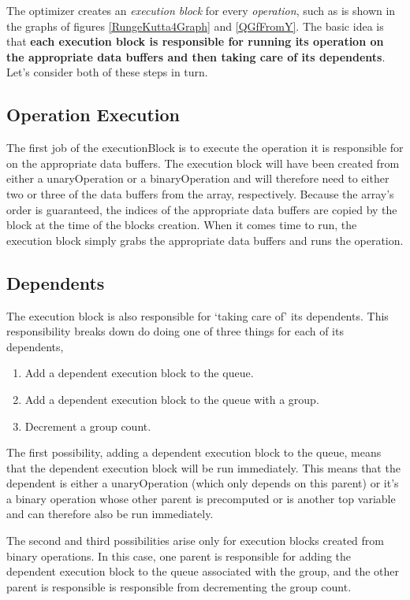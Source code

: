 \documentclass[11pt]{article}
\begin{document}
The optimizer creates an \emph{execution block} for every \emph{operation}, such as is shown in the graphs of figures \ref{RungeKutta4Graph} and \ref{QGfFromY}. The basic idea is that \textbf{each execution block is responsible for running its operation on the appropriate data buffers and then taking care of its dependents}. Let's consider both of these steps in turn.

\subsection{Operation Execution}
The first job of the executionBlock is to execute the operation it is responsible for on the appropriate data buffers. The execution block will have been created from either a unaryOperation or a binaryOperation and will therefore need to either two or three of the data buffers from the array, respectively. Because the array's order is guaranteed, the indices of the appropriate data buffers are copied by the block at the time of the blocks creation. When it comes time to run, the execution block simply grabs the appropriate data buffers and runs the operation.

\subsection{Dependents}
The execution block is also responsible for `taking care of' its dependents. This responsibility breaks down do doing one of three things for each of its dependents,
\begin{enumerate}
\item Add a dependent execution block to the queue.
\item Add a dependent execution block to the queue with a group.
\item Decrement a group count.
\end{enumerate}

The first possibility, adding a dependent execution block to the queue, means that the dependent execution block will be run immediately. This means that the dependent is either a unaryOperation (which only depends on this parent) or it's a binary operation whose other parent is precomputed or is another top variable and can therefore also be run immediately.

The second and third possibilities arise only for execution blocks created from binary operations. In this case, one parent is responsible for adding the dependent execution block to the queue associated with the group, and the other parent is responsible is responsible from decrementing the group count.
\end{document}
